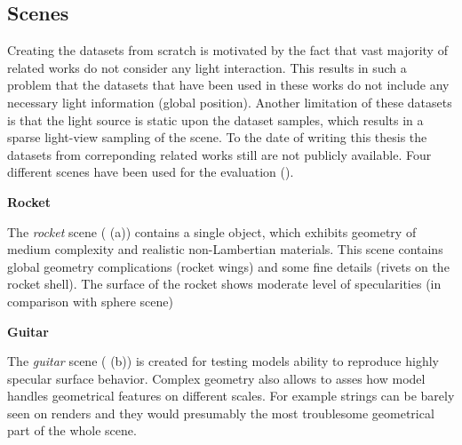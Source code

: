 





\subsection{Scenes}

Creating the datasets from scratch is motivated by the fact that
vast majority of related works do not consider any light interaction.
This results in such a problem that the datasets that have been used in these works
do not include any necessary light information (global position).
Another limitation of these datasets is that the light source is static upon the dataset samples,
which results in a sparse light-view sampling of the scene.
To the date of writing this thesis the datasets from correponding related works \cite{nerv2021}
still are not publicly available.
Four different scenes have been used for the evaluation ().






\textbf{Rocket}

The \textit{rocket} scene ( (a)) contains a single object,
which exhibits geometry of medium complexity and realistic non-Lambertian materials.
This scene contains global geometry complications (rocket wings) and some fine details (rivets on the rocket shell).
The surface of the rocket shows moderate level of specularities (in comparison with sphere scene)

\textbf{Guitar}

The \textit{guitar} scene ( (b)) is created for testing models ability
to reproduce highly specular surface behavior.
Complex geometry also allows to asses how model handles geometrical features on different scales.
For example strings can be barely seen on renders and they would presumably the most troublesome geometrical part of the whole scene.

